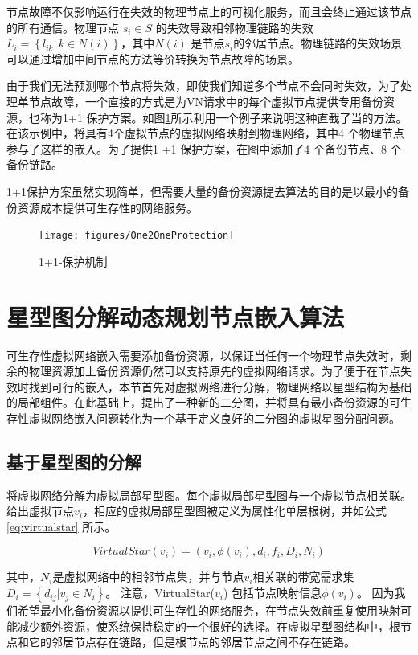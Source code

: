 节点故障不仅影响运行在失效的物理节点上的可视化服务，而且会终止通过该节点的所有通信。物理节点 $ {s_i} \in S $ 的失效导致相邻物理链路的失效${L_i} = \left\{ {{l_{ik}}:k \in N(i)} \right\}$，其中${N(i)}$ 是节点$ {s_i} $的邻居节点。物理链路的失效场景可以通过增加中间节点的方法等价转换为节点故障的场景。

由于我们无法预测哪个节点将失效，即使我们知道多个节点不会同时失效，为了处理单节点故障，一个直接的方式是为VN请求中的每个虚拟节点提供专用备份资源，也称为1+1 保护方案。如图\ref{fig:One2OneProtection}所示利用一个例子来说明这种直截了当的方法。在该示例中，将具有4个虚拟节点的虚拟网络映射到物理网络，其中4 个物理节点参与了这样的嵌入。为了提供1 +1 保护方案，在图中添加了4 个备份节点、8 个备份链路。

1+1保护方案虽然实现简单，但需要大量的备份资源提去算法的目的是以最小的备份资源成本提供可生存性的网络服务。

\begin{figure}[htbp]
\centering
\texttt{[image: figures/One2OneProtection]}\\
\caption{1+1-保护机制}\label{fig:One2OneProtection}
\end{figure}
\section{星型图分解动态规划节点嵌入算法}
可生存性虚拟网络嵌入需要添加备份资源，以保证当任何一个物理节点失效时，剩余的物理资源加上备份资源仍然可以支持原先的虚拟网络请求。为了便于在节点失效时找到可行的嵌入，本节首先对虚拟网络进行分解，物理网络以星型结构为基础的局部组件。在此基础上，提出了一种新的二分图，并将具有最小备份资源的可生存性虚拟网络嵌入问题转化为一个基于定义良好的二分图的虚拟星图分配问题。
\subsection{基于星型图的分解}
将虚拟网络分解为虚拟局部星型图。每个虚拟局部星型图与一个虚拟节点相关联。给出虚拟节点$v_i$，相应的虚拟局部星型图被定义为属性化单层根树，并如公式\ref{eq:virtualstar} 所示。

\begin{equation}
VirtualStar(v_i)=(v_i, \phi(v_i), d_i, f_i, D_i, N_i)
\label{eq:virtualstar}
\end{equation}


其中，$N_i$是虚拟网络中的相邻节点集，并与节点$v_i$相关联的带宽需求集${D_i} = \left\{ {{d_{ij}}|{v_j} \in {N_i}} \right\} $。 注意，VirtualStar($v_i$) 包括节点映射信息$\phi(v_i)$。 因为我们希望最小化备份资源以提供可生存性的网络服务，在节点失效前重复使用映射可能减少额外资源，使系统保持稳定的一个很好的选择。在虚拟星型图结构中，根节点和它的邻居节点存在链路，但是根节点的邻居节点之间不存在链路。

